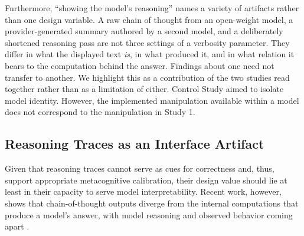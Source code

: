\documentclass[manuscript,review,anonymous]{acmart}
\begin{document}
Furthermore, ``showing the model's reasoning'' names a variety of artifacts rather than one design variable. A raw chain of thought from an open-weight model, a provider-generated summary authored by a second model,
and a deliberately shortened reasoning pass are not three settings of a verbosity
parameter. 
They differ in what the displayed text \emph{is}, in what produced it,
and in what relation it bears to the computation behind the answer. Findings
about one need not transfer to another. We highlight this as a contribution of the
two studies read together rather than as a limitation of either. Control Study aimed to isolate model identity. However,  the implemented manipulation available within a model does not correspond to the manipulation in Study 1.

\subsection{Reasoning Traces as an Interface Artifact}
Given that reasoning traces cannot serve as cues for correctness and, thus, support appropriate metacognitive calibration, their design value should lie at least in their capacity to serve model interpretability. Recent work, however, shows that chain-of-thought outputs diverge from the internal computations that produce a model's answer, with model reasoning and observed behavior coming apart \cite{10.5555/3666122.3669397,lindsey2025biology, barez2025chain}. %
\end{document}
